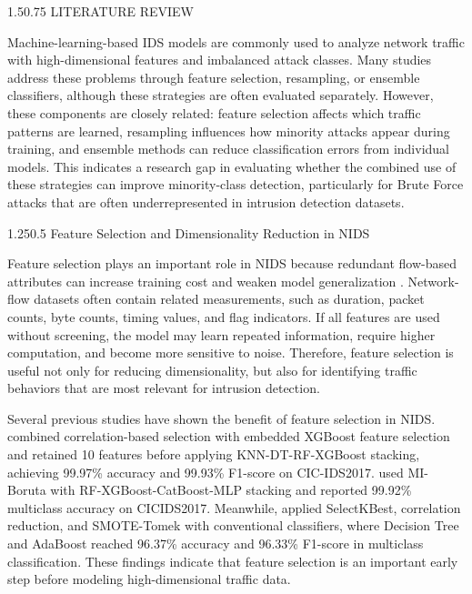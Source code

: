 \documentclass[12pt,a4paper]{article}
\makeatletter
\renewcommand{\section}{\@startsection{section}{1}{0pt}%
  {1.5\baselineskip}{0.75\baselineskip}%
  {\normalfont\fontsize{13}{15.6}\selectfont\bfseries}}
\renewcommand{\subsection}{\@startsection{subsection}{2}{0pt}%
  {1.25\baselineskip}{0.5\baselineskip}%
  {\normalfont\fontsize{13}{15.6}\selectfont\bfseries}}
\makeatother
\begin{document}
\section{LITERATURE REVIEW}

Machine-learning-based IDS models are commonly used to analyze network traffic with high-dimensional features and imbalanced attack classes. Many studies address these problems through feature selection, resampling, or ensemble classifiers, although these strategies are often evaluated separately. However, these components are closely related: feature selection affects which traffic patterns are learned, resampling influences how minority attacks appear during training, and ensemble methods can reduce classification errors from individual models. This indicates a research gap in evaluating whether the combined use of these strategies can improve minority-class detection, particularly for Brute Force attacks that are often underrepresented in intrusion detection datasets.

\subsection{Feature Selection and Dimensionality Reduction in NIDS}

Feature selection plays an important role in NIDS because redundant flow-based attributes can increase training cost and weaken model generalization \parencite{nassreddine2025ensemble,alsaffar2024shielding,khan2024balanced,selvakumar2025feature,yu2025attack}. Network-flow datasets often contain related measurements, such as duration, packet counts, byte counts, timing values, and flag indicators. If all features are used without screening, the model may learn repeated information, require higher computation, and become more sensitive to noise. Therefore, feature selection is useful not only for reducing dimensionality, but also for identifying traffic behaviors that are most relevant for intrusion detection.

Several previous studies have shown the benefit of feature selection in NIDS. \textcite{nassreddine2025ensemble} combined correlation-based selection with embedded XGBoost feature selection and retained 10 features before applying KNN-DT-RF-XGBoost stacking, achieving 99.97\% accuracy and 99.93\% F1-score on CIC-IDS2017. \textcite{alsaffar2024shielding} used MI-Boruta with RF-XGBoost-CatBoost-MLP stacking and reported 99.92\% multiclass accuracy on CICIDS2017. Meanwhile, \textcite{khan2024balanced} applied SelectKBest, correlation reduction, and SMOTE-Tomek with conventional classifiers, where Decision Tree and AdaBoost reached 96.37\% accuracy and 96.33\% F1-score in multiclass classification. These findings indicate that feature selection is an important early step before modeling high-dimensional traffic data.
\end{document}
